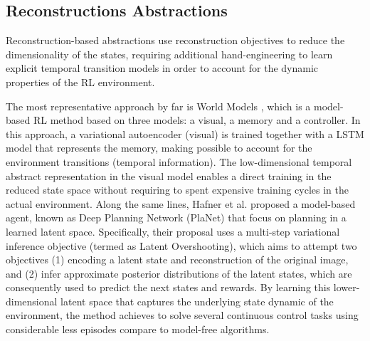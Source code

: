 
\subsection{Reconstructions Abstractions}

Reconstruction-based abstractions use reconstruction objectives to reduce the dimensionality of the states, requiring additional hand-engineering to learn explicit temporal transition models in order to account for the dynamic properties of the RL environment. 

The most representative approach by far is World Models \cite{ha2018world}, which is a model-based RL method based on three models: a visual, a memory and a controller. In this approach, a variational autoencoder (visual) is trained together with a LSTM model that represents the memory, making possible to account for the environment transitions (temporal information). The low-dimensional temporal abstract representation in the visual model enables a direct training in the reduced state space without requiring to spent expensive training cycles in the actual environment. Along the same lines, Hafner et al. \cite{hafner2019learning} proposed a model-based agent, known as Deep Planning Network (PlaNet) that focus on planning in a learned latent space. Specifically, their proposal uses a multi-step variational inference objective (termed as Latent Overshooting), which aims to attempt two objectives (1) encoding a latent state and reconstruction of the original image, and (2) infer approximate posterior distributions of the latent states, which are consequently used to predict the next states and rewards. By learning this lower-dimensional latent space that captures the underlying state dynamic of the environment, the method achieves to solve several continuous control tasks using considerable less episodes compare to model-free algorithms.





 
